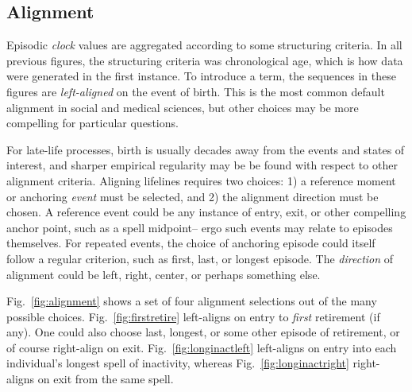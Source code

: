 \documentclass{article}
\begin{document}
\FloatBarrier
\subsection{Alignment}
\label{sec:align}
Episodic \emph{clock} values are aggregated according to some structuring criteria. In all previous figures, the structuring criteria was chronological age, which is how data were generated in the first instance. To introduce a term, the sequences in these figures are \emph{left-aligned} on the event of birth. This is the most common default alignment in social and medical sciences, but other choices may be more compelling for particular questions.

For late-life processes, birth is usually decades away from the events and states of interest, and sharper empirical regularity may be be found with respect to other alignment criteria. Aligning lifelines requires two choices: 1) a reference moment or anchoring \emph{event} must be selected, and 2) the alignment direction must be chosen. A reference event could be any instance of entry, exit, or other compelling anchor point, such as a spell midpoint-- ergo such events may relate to episodes themselves. For repeated events, the choice of anchoring episode could itself follow a regular criterion, such as first, last, or longest episode. The \emph{direction} of alignment could be left, right, center, or perhaps something else.

Fig.~\ref{fig:alignment} shows a set of four alignment selections out of the
many possible choices. Fig.~\ref{fig:firstretire} left-aligns on
entry to \emph{first} retirement (if any). One could also choose last, longest,
or some other episode of retirement, or of course right-align on exit.
Fig.~\ref{fig:longinactleft} left-aligns on entry into each individual's
longest spell of inactivity, whereas Fig.~\ref{fig:longinactright} right-aligns on exit from
the same spell.
\end{document}
